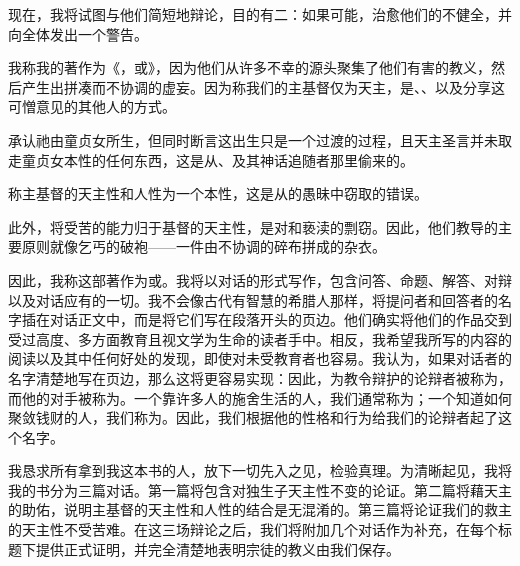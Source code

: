 现在，我将试图与他们简短地辩论，目的有二：如果可能，治愈他们的不健全，并向全体发出一个警告。\par

我称我的著作为《，或》，因为他们从许多不幸的源头聚集了他们有害的教义，然后产生出拼凑而不协调的虚妄。因为称我们的主基督仅为天主，是、、以及分享这可憎意见的其他人的方式。\par

承认祂由童贞女所生，但同时断言这出生只是一个过渡的过程，且天主圣言并未取走童贞女本性的任何东西，这是从、及其神话追随者那里偷来的。\par

称主基督的天主性和人性为一个本性，这是从的愚昧中窃取的错误。\par

此外，将受苦的能力归于基督的天主性，是对和亵渎的剽窃。因此，他们教导的主要原则就像乞丐的破袍——一件由不协调的碎布拼成的杂衣。\par

因此，我称这部著作为或。我将以对话的形式写作，包含问答、命题、解答、对辩以及对话应有的一切。我不会像古代有智慧的希腊人那样，将提问者和回答者的名字插在对话正文中，而是将它们写在段落开头的页边。\newline{}他们确实将他们的作品交到受过高度、多方面教育且视文学为生命的读者手中。相反，我希望我所写的内容的阅读以及其中任何好处的发现，即使对未受教育者也容易。我认为，如果对话者的名字清楚地写在页边，那么这将更容易实现：因此，为教令辩护的论辩者被称为，而他的对手被称为。\newline{}一个靠许多人的施舍生活的人，我们通常称为；一个知道如何聚敛钱财的人，我们称为。因此，我们根据他的性格和行为给我们的论辩者起了这个名字。\par

我恳求所有拿到我这本书的人，放下一切先入之见，检验真理。为清晰起见，我将我的书分为三篇对话。\newline{}第一篇将包含对独生子天主性不变的论证。第二篇将藉天主的助佑，说明主基督的天主性和人性的结合是无混淆的。第三篇将论证我们的救主的天主性不受苦难。\newline{}在这三场辩论之后，我们将附加几个对话作为补充，在每个标题下提供正式证明，并完全清楚地表明宗徒的教义由我们保存。\par


